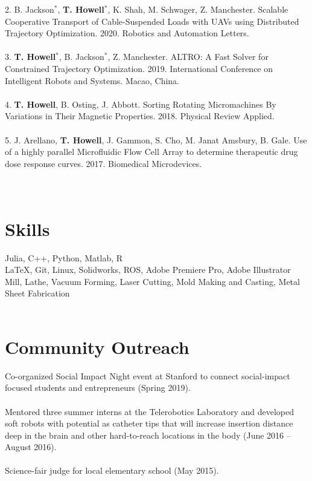 \documentclass[margin,line]{res}
\begin{document}
\begin{resume}
2. B. Jackson$^*$, \textbf{T. Howell}$^*$, K. Shah, M. Schwager, Z. Manchester. Scalable Cooperative Transport of Cable-Suspended Loads with UAVs using Distributed Trajectory Optimization. 2020. Robotics and Automation Letters.\\
\\
3. \textbf{T. Howell}$^*$, B. Jackson$^*$, Z. Manchester. ALTRO: A Fast Solver for Constrained Trajectory Optimization. 2019. International Conference on Intelligent Robots and Systems. Macao, China.\\
\\
4. \textbf{T. Howell}, B. Osting, J. Abbott. Sorting Rotating Micromachines By Variations in Their Magnetic
Properties. 2018. Physical Review Applied.\\
\\
5. J. Arellano, \textbf{T. Howell}, J. Gammon, S. Cho, M. Janat Amsbury, B. Gale. Use of a highly parallel
Microfluidic Flow Cell Array to determine therapeutic drug dose response curves. 2017. Biomedical
Microdevices.\\
\\
\\
\section{\sc Skills}
Julia, C++, Python, Matlab, R\\
\LaTeX, Git, Linux, Solidworks, ROS, Adobe Premiere Pro, Adobe Illustrator \\
Mill, Lathe, Vacuum Forming, Laser Cutting, Mold Making and Casting, Metal Sheet Fabrication\\
\\
\section{\sc Community Outreach}
Co-organized Social Impact Night event at Stanford to connect social-impact focused students and entrepreneurs (Spring 2019).\\
\\
Mentored three summer interns at the Telerobotics Laboratory and developed soft robots with potential as catheter tips that will increase insertion distance deep in the brain and other hard-to-reach locations in the body (June 2016 – August 2016).\\
\\
Science-fair judge for local elementary school (May 2015).\\
\\

\end{resume}
\end{document}
